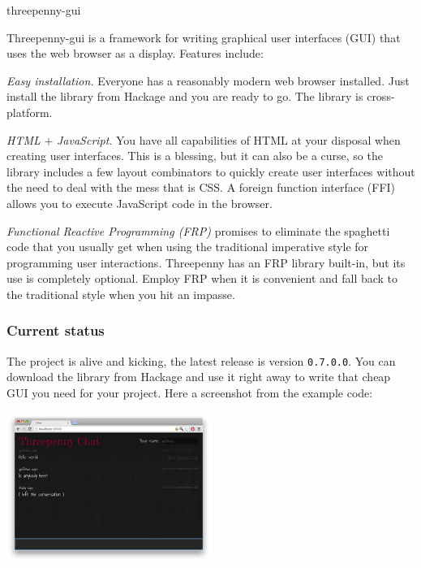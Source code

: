 \begin{hcarentry}{threepenny-gui}
\label{threepenny-gui}
\makeheader

Threepenny-gui is a framework for writing graphical user interfaces (GUI)
that uses the web browser as a display. Features include:

\begin{compactitem}
\item \emph{Easy installation.} Everyone has a reasonably modern web browser
  installed. Just install the library from Hackage and you are ready to go.
  The library is cross-platform.
\item \emph{HTML} + \emph{JavaScript}. You have all capabilities of HTML at
  your disposal when creating user interfaces. This is a blessing, but it can
  also be a curse, so the library includes a few layout combinators to quickly
  create user interfaces without the need to deal with the mess that is CSS. A
  foreign function interface (FFI) allows you to execute JavaScript code in
  the browser.
\item \emph{Functional Reactive Programming (FRP)} promises to eliminate the
  spaghetti code that you usually get when using the traditional imperative
  style for programming user interactions. Threepenny has an FRP library
  built-in, but its use is completely optional. Employ FRP when it is
  convenient and fall back to the traditional style when you hit an impasse.
\end{compactitem}

\subsubsection*{Current status}

The project is alive and kicking, the latest release is version
\verb`0.7.0.0`. You can download the library from Hackage and use it right
away to write that cheap GUI you need for your project. Here a screenshot from
the example code:

\begin{center}
\includegraphics[width=0.5\textwidth]{html/chat.jpg}
\end{center}


\end{hcarentry}
